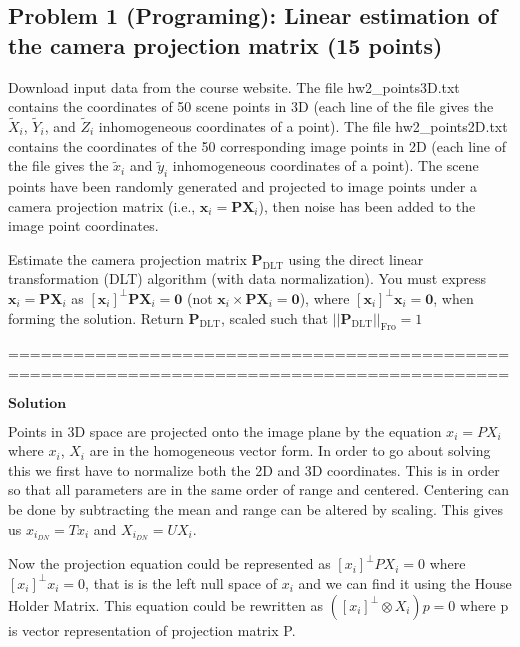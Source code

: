 \documentclass[11pt]{article}
\begin{document}
    \subsection{Problem 1 (Programing): Linear estimation of the camera
projection matrix (15
points)}\label{problem-1-programing-linear-estimation-of-the-camera-projection-matrix-15-points}

Download input data from the course website. The file hw2\_points3D.txt
contains the coordinates of 50 scene points in 3D (each line of the file
gives the \(\tilde{X}_i\), \(\tilde{Y}_i\), and \(\tilde{Z}_i\)
inhomogeneous coordinates of a point). The file hw2\_points2D.txt
contains the coordinates of the 50 corresponding image points in 2D
(each line of the file gives the \(\tilde{x}_i\) and \(\tilde{y}_i\)
inhomogeneous coordinates of a point). The scene points have been
randomly generated and projected to image points under a camera
projection matrix (i.e.,
\(\boldsymbol{x}_i  = \boldsymbol{P} \boldsymbol{X}_i\)), then noise has
been added to the image point coordinates.

Estimate the camera projection matrix \(\boldsymbol{P}_\text{DLT}\)
using the direct linear transformation (DLT) algorithm (with data
normalization). You must express
\(\boldsymbol{x}_i = \boldsymbol{P} \boldsymbol{X}_i\) as
\([\boldsymbol{x}_i]^\perp \boldsymbol{P} \boldsymbol{X}_i = \boldsymbol{0}\)
(not
\(\boldsymbol{x}_i \times \boldsymbol{P} \boldsymbol{X}_i = \boldsymbol{0}\)),
where \([\boldsymbol{x}_i]^\perp \boldsymbol{x}_i = \boldsymbol{0}\),
when forming the solution. Return \(\boldsymbol{P}_\text{DLT}\), scaled
such that \(||\boldsymbol{P}_\text{DLT}||_\text{Fro} = 1\)

============================================================================================

\(\boldsymbol{Solution}\)

Points in 3D space are projected onto the image plane by the equation
\(x_{i} = PX_{i}\) where \(x_{i}\), \(X_{i}\) are in the homogeneous
vector form. In order to go about solving this we first have to
normalize both the 2D and 3D coordinates. This is in order so that all
parameters are in the same order of range and centered. Centering can be
done by subtracting the mean and range can be altered by scaling. This
gives us \(x_{i_{DN}} = Tx_{i}\) and \(X_{i_{DN}} = UX_{i}\).

Now the projection equation could be represented as
\([x_{i}]^\perp PX_{i} = 0\) where \([x_{i}]^\perp x_{i} = 0\), that is
is the left null space of \(x_{i}\) and we can find it using the House
Holder Matrix. This equation could be rewritten as
\(([x_{i}]^\perp \otimes X_{i})p = 0\) where p is vector representation
of projection matrix P.
\end{document}
